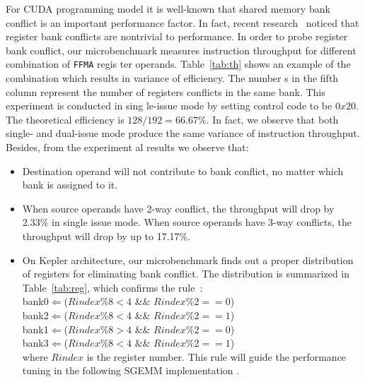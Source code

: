 For CUDA programming model it is well-known that shared memory bank conflict is an important performance factor. In
fact, recent research~\cite{lai} noticed that register bank conflicts are nontrivial to performance.  In order to probe 
register bank conflict, our microbenchmark measures instruction throughput for different combination of {\tt FFMA} regis
ter operands. Table~\ref{tab:th} shows an example of the combination which results in variance of efficiency. The number
s in the fifth column represent the number of registers conflicts in the same bank. This experiment is conducted in sing
le-issue mode by setting control code to be $0x20$. The theoretical efficiency is $128/192=66.67\%$. In fact, we observe
 that both single- and dual-issue mode produce the same variance of instruction throughput. Besides, from the experiment
al results we observe that:
\begin{itemize}
\item Destination operand will not contribute to bank conflict, no matter which bank is assigned to it.
\item When source operands have 2-way conflict, the throughput will drop by 2.33\% in single issue
    mode. When source operands have 3-way conflicts, the throughput will drop by up to 17.17\%.

 \item On Kepler architecture, our microbenchmark finds out a proper distribution of registers for eliminating bank
     conflict. The distribution is summarized in Table~\ref{tab:reg}, which confirms the rule~\cite{lai}: \\
 bank0$\Leftarrow$($Rindex \% 8 < 4$ \&\& $Rindex \% 2 == 0$) \\
 bank2$\Leftarrow$($Rindex \% 8 < 4$ \&\&
$Rindex \% 2 == 1$) \\
bank1$\Leftarrow$($Rindex \% 8 > 4$ \&\& $Rindex \%2 == 0$) \\
bank3$\Leftarrow$($Rindex \% 8 < 4$ \&\&
$Rindex\% 2 == 1$)\\
where $Rindex$ is the register number. This rule will guide the performance tuning in the following SGEMM implementation
.

\end{itemize}

